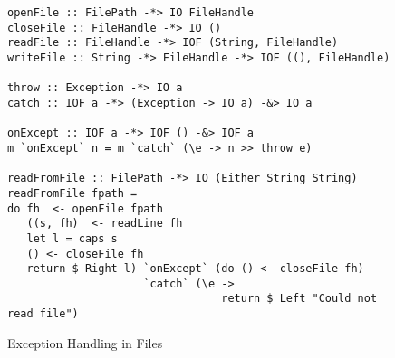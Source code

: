 \begin{figure}[h]
  \begin{framed}
    \begin{verbatim}
openFile :: FilePath -*> IO FileHandle
closeFile :: FileHandle -*> IO ()
readFile :: FileHandle -*> IOF (String, FileHandle)
writeFile :: String -*> FileHandle -*> IOF ((), FileHandle)

throw :: Exception -*> IO a
catch :: IOF a -*> (Exception -> IO a) -&> IO a

onExcept :: IOF a -*> IOF () -&> IOF a
m `onExcept` n = m `catch` (\e -> n >> throw e)

readFromFile :: FilePath -*> IO (Either String String)
readFromFile fpath =
do fh  <- openFile fpath
   ((s, fh)  <- readLine fh
   let l = caps s
   () <- closeFile fh
   return $ Right l) `onExcept` (do () <- closeFile fh)
                     `catch` (\e ->
                                 return $ Left "Could not read file")
    \end{verbatim}
  \end{framed}
  \caption{Exception Handling in Files}
  \label{fig:qub-file-exceptions}
\end{figure}


